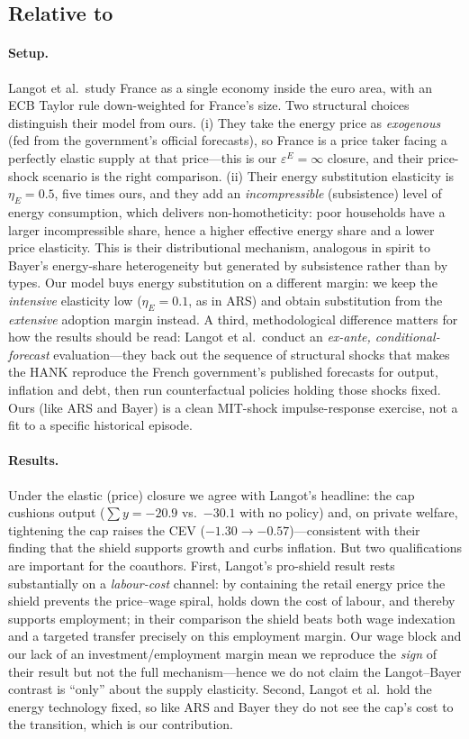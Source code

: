 \documentclass[11pt,a4paper]{article}
\begin{document}
\subsection{Relative to \citet{Langot2026}}

\paragraph{Setup.} Langot et al.\ study France as a single economy inside the
euro area, with an ECB Taylor rule down-weighted for France's size. Two
structural choices distinguish their model from ours. (i) They take the energy
price as \emph{exogenous} (fed from the government's official forecasts), so
France is a price taker facing a perfectly elastic supply at that price---this
is our $\varepsilon^E=\infty$ closure, and their price-shock scenario is the
right comparison. (ii) Their energy substitution elasticity is $\eta_E=0.5$,
five times ours, and they add an \emph{incompressible} (subsistence) level of
energy consumption, which delivers non-homotheticity: poor households have a
larger incompressible share, hence a higher effective energy share and a lower
price elasticity. This is their distributional mechanism, analogous in spirit
to Bayer's energy-share heterogeneity but generated by subsistence rather than
by types. Our model buys energy substitution on a different margin: we keep the
\emph{intensive} elasticity low ($\eta_E=0.1$, as in ARS) and obtain
substitution from the \emph{extensive} adoption margin instead. A third,
methodological difference matters for how the results should be read: Langot et
al.\ conduct an \emph{ex-ante, conditional-forecast} evaluation---they back out
the sequence of structural shocks that makes the HANK reproduce the French
government's published forecasts for output, inflation and debt, then run
counterfactual policies holding those shocks fixed. Ours (like ARS and Bayer)
is a clean MIT-shock impulse-response exercise, not a fit to a specific
historical episode.

\paragraph{Results.} Under the elastic (price) closure we agree with Langot's
headline: the cap cushions output ($\sum y = -20.9$ vs.\ $-30.1$ with no
policy) and, on private welfare, tightening the cap raises the CEV
($-1.30\to-0.57$)---consistent with their finding that the shield supports
growth and curbs inflation. But two qualifications are important for the
coauthors. First, Langot's pro-shield result rests substantially on a
\emph{labour-cost} channel: by containing the retail energy price the shield
prevents the price--wage spiral, holds down the cost of labour, and thereby
supports employment; in their comparison the shield beats both wage indexation
and a targeted transfer precisely on this employment margin. Our wage block and
our lack of an investment/employment margin mean we reproduce the \emph{sign}
of their result but not the full mechanism---hence we do not claim the
Langot--Bayer contrast is ``only'' about the supply elasticity. Second, Langot
et al.\ hold the energy technology fixed, so like ARS and Bayer they do not see
the cap's cost to the transition, which is our contribution.
\end{document}
